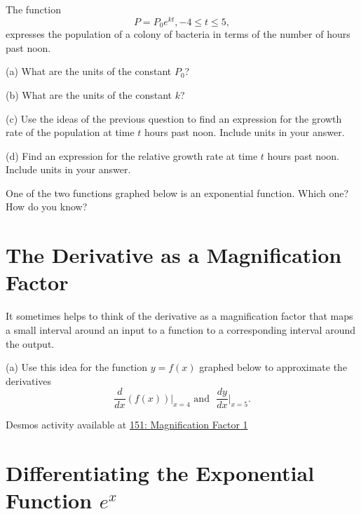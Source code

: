 \documentclass{ximera}
\begin{document}
\begin{question}  \label{Q:3dgtnzz}
The function 
\[
      P = P_0 e^{kt}, -4\leq t \leq 5 ,
\]
expresses the population of a colony of bacteria in terms of the number of hours past noon.


(a) What are the units of the constant $P_0$?

(b) What are the units of the constant $k$?

(c) Use the ideas of the previous question to find an expression for the growth rate of the population at time $t$ hours past noon. Include units in your answer.

(d) Find an expression for the relative growth rate at time $t$ hours past noon. Include units in your answer.

\end{question}




\begin{question} \label{Qdcvbrtt}
One of the two functions graphed below is an exponential function. Which one? How do you know?
\end{question}



\section*{The Derivative as a Magnification Factor}
\begin{exploration}   \label{Ex:325gyt}

It sometimes helps to think of the derivative as a magnification factor that maps a small interval around an input to a function to a corresponding interval around the output.

(a) Use this idea for the function $y=f(x)$ graphed below to approximate the derivatives 
\[
    \frac{d}{dx} (f(x))\Big|_{x=4} \text{  and  } \,\, \frac{dy}{dx}\Big|_{x=5} .
\]


\begin{onlineOnly}
    \begin{center}
\end{center}
\end{onlineOnly}


Desmos activity available at \href{https://www.desmos.com/calculator/la4f5ots3r}{151: Magnification Factor 1}

\end{exploration}


\section*{Differentiating the Exponential Function $e^x$}
\end{document}
